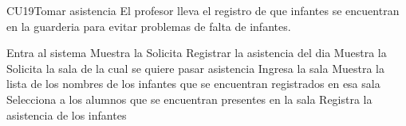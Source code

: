 
	\begin{UseCase}{CU19}{Tomar asistencia}{
		El profesor lleva el registro de que infantes se encuentran en la guarderia para evitar problemas de falta de infantes.
	}
	\end{UseCase}
	\begin{UCtrayectoria}
            \UCpaso[\UCactor] Entra al sistema
            \UCpaso Muestra la 
            \UCpaso[\UCactor] Solicita Registrar la asistencia del dia
            \UCpaso Muestra la 
            \UCpaso Solicita la sala de la cual se quiere pasar asistencia
            \UCpaso [\UCactor] Ingresa la sala
            \UCpaso Muestra la lista de los nombres de los infantes que se encuentran registrados en esa sala
            \UCpaso[\UCactor] Selecciona a los alumnos que se encuentran presentes en la sala
            \UCpaso Registra la asistencia de los infantes
	\end{UCtrayectoria}

		
